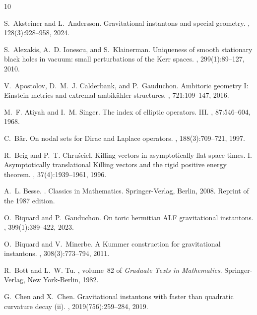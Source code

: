 \documentclass[a4paper,10pt,reqno]{amsart}
\theoremstyle{plain}
\numberwithin{equation}{section}
\begin{document}
\def\cprime{$'$}
\begin{thebibliography}{10}

S.~Aksteiner and L.~Andersson.
\newblock Gravitational instantons and special geometry.
, 128(3):928--958, 2024.

S.~Alexakis, A.~D. Ionescu, and S.~Klainerman.
\newblock Uniqueness of smooth stationary black holes in vacuum: small
  perturbations of the {K}err spaces.
, 299(1):89--127, 2010.

V.~Apostolov, D.~M.~J. Calderbank, and P.~Gauduchon.
\newblock Ambitoric geometry {I}: {E}instein metrics and extremal
  ambik\"{a}hler structures.
, 721:109--147, 2016.

M.~F. Atiyah and I.~M. Singer.
\newblock The index of elliptic operators. {III}.
, 87:546--604, 1968.

C.~B\"{a}r.
\newblock On nodal sets for {D}irac and {L}aplace operators.
, 188(3):709--721, 1997.

R.~Beig and P.~T. Chru\'{s}ciel.
\newblock Killing vectors in asymptotically flat space-times. {I}.
  {A}symptotically translational {K}illing vectors and the rigid positive
  energy theorem.
, 37(4):1939--1961, 1996.

A.~L. Besse.
.
\newblock Classics in Mathematics. Springer-Verlag, Berlin, 2008.
\newblock Reprint of the 1987 edition.

O.~Biquard and P.~Gauduchon.
\newblock On toric hermitian {ALF} gravitational instantons.
, 399(1):389--422, 2023.

O.~Biquard and V.~Minerbe.
\newblock A {K}ummer construction for gravitational instantons.
, 308(3):773--794, 2011.

R.~Bott and L.~W. Tu.
, volume~82 of {\em
  Graduate Texts in Mathematics}.
\newblock Springer-Verlag, New York-Berlin, 1982.

G.~Chen and X.~Chen.
\newblock Gravitational instantons with faster than quadratic curvature decay
  (ii).
, 2019(756):259--284, 2019.


\end{thebibliography}
\end{document}
